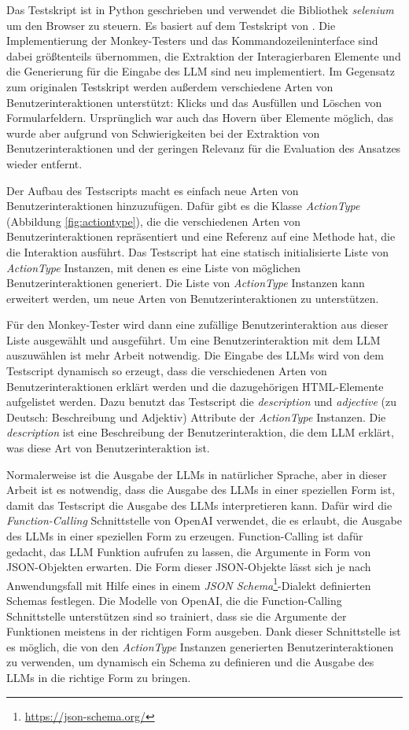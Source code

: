 Das Testskript ist in Python geschrieben und verwendet die Bibliothek \textit{selenium} um den Browser zu steuern.
Es basiert auf dem Testskript von  \cite{GPT3Testing}.
Die Implementierung der Monkey-Testers und das Kommandozeileninterface sind dabei größtenteils übernommen, die Extraktion der Interagierbaren Elemente und die Generierung für die Eingabe des LLM sind neu implementiert.
Im Gegensatz zum originalen Testskript werden außerdem verschiedene Arten von Benutzerinteraktionen unterstützt: Klicks und das Ausfüllen und Löschen von Formularfeldern.
Ursprünglich war auch das Hovern über Elemente möglich, das wurde aber aufgrund von Schwierigkeiten bei der Extraktion von Benutzerinteraktionen und der geringen Relevanz für die Evaluation des Ansatzes wieder entfernt.

Der Aufbau des Testscripts macht es einfach neue Arten von Benutzerinteraktionen hinzuzufügen.
Dafür gibt es die Klasse \textit{ActionType} (Abbildung \ref{fig:actiontype}), die die verschiedenen Arten von Benutzerinteraktionen repräsentiert und eine Referenz auf eine Methode hat, die die Interaktion ausführt.
Das Testscript hat eine statisch initialisierte Liste von \textit{ActionType} Instanzen, mit denen es eine Liste von möglichen Benutzerinteraktionen generiert.
Die Liste von \textit{ActionType} Instanzen kann erweitert werden, um neue Arten von Benutzerinteraktionen zu unterstützen.

Für den Monkey-Tester wird dann eine zufällige Benutzerinteraktion aus dieser Liste ausgewählt und ausgeführt.
Um eine Benutzerinteraktion mit dem LLM auszuwählen ist mehr Arbeit notwendig.
Die Eingabe des LLMs wird von dem Testscript dynamisch so erzeugt, dass die verschiedenen Arten von Benutzerinteraktionen erklärt werden und die dazugehörigen HTML-Elemente aufgelistet werden.
Dazu benutzt das Testscript die \textit{description} und \textit{adjective} (zu Deutsch: Beschreibung und Adjektiv) Attribute der \textit{ActionType} Instanzen.
Die \textit{description} ist eine Beschreibung der Benutzerinteraktion, die dem LLM erklärt, was diese Art von Benutzerinteraktion ist.

Normalerweise ist die Ausgabe der LLMs in natürlicher Sprache, aber in dieser Arbeit ist es notwendig, dass die Ausgabe des LLMs in einer speziellen Form ist, damit das Testscript die Ausgabe des LLMs interpretieren kann.
Dafür wird die \textit{Function-Calling} Schnittstelle von OpenAI verwendet, die es erlaubt, die Ausgabe des LLMs in einer speziellen Form zu erzeugen.
Function-Calling ist dafür gedacht, das LLM Funktion aufrufen zu lassen, die Argumente in Form von JSON-Objekten erwarten.
Die Form dieser JSON-Objekte lässt sich je nach Anwendungsfall mit Hilfe eines in einem \textit{JSON Schema}\footnote{\url{https://json-schema.org/}}-Dialekt definierten Schemas festlegen.
Die Modelle von OpenAI, die die Function-Calling Schnittstelle unterstützen sind so trainiert, dass sie die Argumente der Funktionen meistens in der richtigen Form ausgeben.
Dank dieser Schnittstelle ist es möglich, die von den \textit{ActionType} Instanzen generierten Benutzerinteraktionen zu verwenden, um dynamisch ein Schema zu definieren und die Ausgabe des LLMs in die richtige Form zu bringen.



